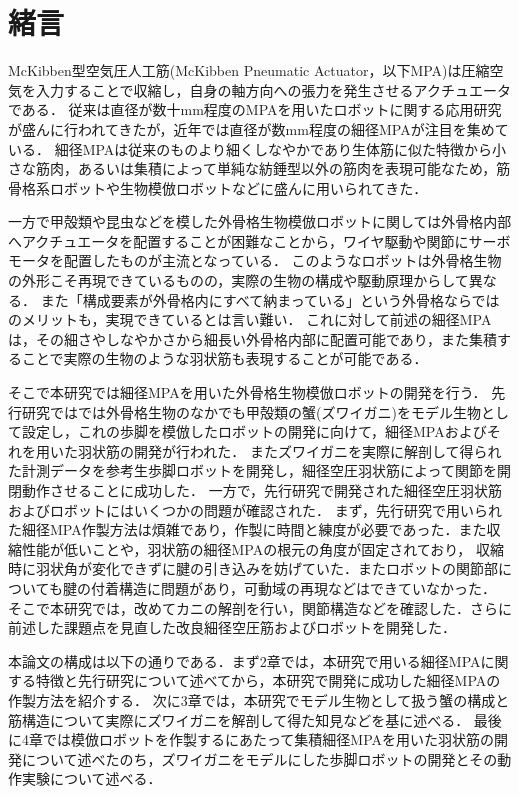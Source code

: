 \newpage
\setcounter{page}{1}
\section{緒言}
McKibben型空気圧人工筋(McKibben Pneumatic Actuator，以下MPA)は圧縮空気を入力することで収縮し，自身の軸方向への張力を発生させるアクチュエータである\cite{2003722}．
従来は直径が数十mm程度のMPAを用いたロボットに関する応用研究が盛んに行われてきたが，近年では直径が数mm程度の細径MPAが注目を集めている\cite{wakimoto}．
細径MPAは従来のものより細くしなやかであり生体筋に似た特徴から小さな筋肉，あるいは集積によって単純な紡錘型以外の筋肉を表現可能なため，筋骨格系ロボットや生物模倣ロボットなどに盛んに用いられてきた\cite{森田隆介2016}\cite{森和也2014}．

一方で甲殻類や昆虫などを模した外骨格生物模倣ロボットに関しては外骨格内部へアクチュエータを配置することが困難なことから，ワイヤ駆動\cite{jmse10121804}や関節にサーボモータを配置したもの\cite{jmse10121804}が主流となっている．
このようなロボットは外骨格生物の外形こそ再現できているものの，実際の生物の構成や駆動原理からして異なる．
また「構成要素が外骨格内にすべて納まっている」という外骨格ならではのメリットも，実現できているとは言い難い．
これに対して前述の細径MPAは，その細さやしなやかさから細長い外骨格内部に配置可能であり，また集積することで実際の生物のような羽状筋も表現することが可能である\cite{2003}．

そこで本研究では細径MPAを用いた外骨格生物模倣ロボットの開発を行う．
先行研究では\cite{hasegawa}では外骨格生物のなかでも甲殻類の蟹(ズワイガニ)をモデル生物として設定し，これの歩脚を模倣したロボットの開発に向けて，細径MPAおよびそれを用いた羽状筋の開発が行われた．
またズワイガニを実際に解剖して得られた計測データを参考生歩脚ロボットを開発し，細径空圧羽状筋によって関節を開閉動作させることに成功した\cite{hasegawa}．
一方で，先行研究で開発された細径空圧羽状筋およびロボットにはいくつかの問題が確認された．
まず，先行研究で用いられた細径MPA作製方法は煩雑であり，作製に時間と練度が必要であった．また収縮性能が低いことや，羽状筋の細径MPAの根元の角度が固定されており，
収縮時に羽状角が変化できずに腱の引き込みを妨げていた．またロボットの関節部についても腱の付着構造に問題があり，可動域の再現などはできていなかった．
そこで本研究では，改めてカニの解剖を行い，関節構造などを確認した．さらに前述した課題点を見直した改良細径空圧筋およびロボットを開発した．

本論文の構成は以下の通りである．まず2章では，本研究で用いる細径MPAに関する特徴と先行研究について述べてから，本研究で開発に成功した細径MPAの作製方法を紹介する．
次に3章では，本研究でモデル生物として扱う蟹の構成と筋構造について実際にズワイガニを解剖して得た知見などを基に述べる．
最後に4章では模倣ロボットを作製するにあたって集積細径MPAを用いた羽状筋の開発について述べたのち，ズワイガニをモデルにした歩脚ロボットの開発とその動作実験について述べる．


